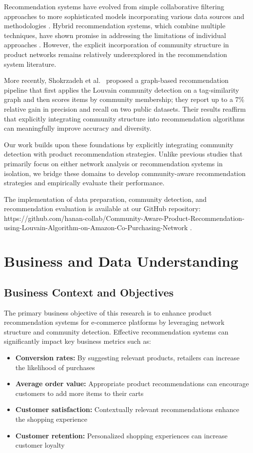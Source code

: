 \documentclass[conference]{IEEEtran}
\begin{document}
Recommendation systems have evolved from simple collaborative filtering approaches to more sophisticated models incorporating various data sources and methodologies \cite{ricci2011introduction}. Hybrid recommendation systems, which combine multiple techniques, have shown promise in addressing the limitations of individual approaches \cite{burke2002hybrid}. However, the explicit incorporation of community structure in product networks remains relatively underexplored in the recommendation system literature.

More recently, Shokrzadeh et al.\ \cite{shokrzadeh2022graph} proposed a graph-based recommendation pipeline that first applies the Louvain community detection on a tag-similarity graph and then scores items by community membership; they report up to a 7\% relative gain in precision and recall on two public datasets. Their results reaffirm that explicitly integrating community structure into recommendation algorithms can meaningfully improve accuracy and diversity.

Our work builds upon these foundations by explicitly integrating community detection with product recommendation strategies. Unlike previous studies that primarily focus on either network analysis or recommendation systems in isolation, we bridge these domains to develop community-aware recommendation strategies and empirically evaluate their performance.

The implementation of data preparation, community detection, and recommendation evaluation is available at our GitHub repository: https://github.com/hanan-collab/Community-Aware-Product-Recommendation-using-Louvain-Algorithm-on-Amazon-Co-Purchasing-Network \cite{repo}.

\section{Business and Data Understanding}
\subsection{Business Context and Objectives}
The primary business objective of this research is to enhance product recommendation systems for e-commerce platforms by leveraging network structure and community detection. Effective recommendation systems can significantly impact key business metrics such as:

\begin{itemize}
    \item \textbf{Conversion rates:} By suggesting relevant products, retailers can increase the likelihood of purchases
    \item \textbf{Average order value:} Appropriate product recommendations can encourage customers to add more items to their carts
    \item \textbf{Customer satisfaction:} Contextually relevant recommendations enhance the shopping experience
    \item \textbf{Customer retention:} Personalized shopping experiences can increase customer loyalty
\end{itemize}
\end{document}

